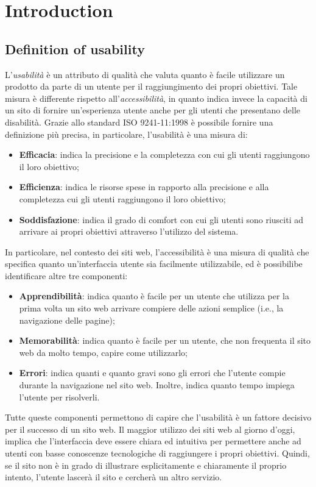 \section{Introduction}

\subsection{Definition of usability}
L'\textit{usabilità} è un attributo di qualità che valuta quanto è facile 
utilizzare un prodotto da parte di un utente per il raggiungimento dei 
propri obiettivi.  Tale misura è differente rispetto  
all'\textit{accessibilità}, in quanto indica invece la capacità 
di un sito di fornire un'esperienza utente anche per gli utenti che 
presentano delle disabilità. Grazie allo standard ISO 9241-11:1998 è 
possibile fornire una definizione più precisa, in particolare, l'usabilità 
è una misura di:
\begin{itemize}
  \item \textbf{Efficacia}: indica la precisione e la completezza con cui 
  gli utenti raggiungono il loro obiettivo;
  \item \textbf{Efficienza}: indica le risorse spese in rapporto alla 
  precisione e alla completezza cui gli utenti raggiungono il loro 
  obiettivo;
  \item \textbf{Soddisfazione}: indica il grado di comfort con cui gli 
  utenti sono riusciti ad arrivare ai propri obiettivi attraverso 
  l'utilizzo del sistema.
\end{itemize}

In particolare, nel contesto dei siti web, l'accessibilità è una misura di 
qualità che specifica quanto un’interfaccia utente sia facilmente 
utilizzabile, ed è possibilibe identificare altre tre componenti:
\begin{itemize}
  \item \textbf{Apprendibilità}: indica quanto è facile per un utente che 
  utilizza per la prima volta un sito web arrivare compiere delle azioni 
  semplice (i.e., la navigazione delle pagine);
  \item \textbf{Memorabilità}: indica quanto è facile per un utente, che non 
  frequenta il sito web da molto tempo, capire come utilizzarlo;
  \item \textbf{Errori}: indica quanti e quanto gravi sono gli errori che 
  l'utente compie durante la navigazione nel sito web. Inoltre, indica quanto 
  tempo impiega l'utente per risolverli.
\end{itemize}

Tutte queste componenti permettono di capire che l'usabilità è un fattore 
decisivo per il successo di un sito web. Il maggior utilizzo dei siti web 
al giorno d'oggi, implica che l'interfaccia deve essere chiara ed intuitiva 
per permettere anche ad utenti con basse conoscenze tecnologiche di 
raggiungere i propri obiettivi. Quindi, se il sito non è in grado di 
illustrare esplicitamente e chiaramente il proprio intento, l'utente 
lascerà il sito e cercherà un altro servizio.